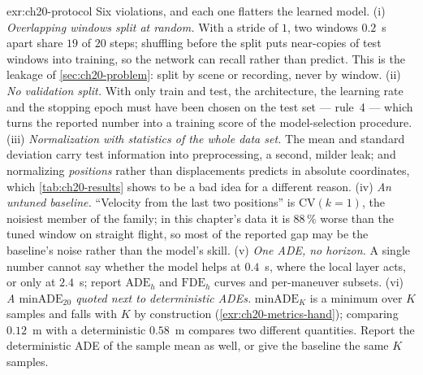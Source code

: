 \begin{solution}{exr:ch20-protocol}
Six violations, and each one flatters the learned model.
(i) \emph{Overlapping windows split at random.} With a stride of $1$, two windows $0.2$~s apart share $19$ of $20$ steps; shuffling before the split puts near-copies of test windows into training, so the network can recall rather than predict. This is the leakage of \cref{sec:ch20-problem}: split by scene or recording, never by window.
(ii) \emph{No validation split.} With only train and test, the architecture, the learning rate and the stopping epoch must have been chosen on the test set --- rule~4 --- which turns the reported number into a training score of the model-selection procedure.
(iii) \emph{Normalization with statistics of the whole data set.} The mean and standard deviation carry test information into preprocessing, a second, milder leak; and normalizing \emph{positions} rather than displacements predicts in absolute coordinates, which \cref{tab:ch20-results} shows to be a bad idea for a different reason.
(iv) \emph{An untuned baseline.} ``Velocity from the last two positions'' is $\mathrm{CV}(k = 1)$, the noisiest member of the family; in this chapter's data it is $88\,\%$ worse than the tuned window on straight flight, so most of the reported gap may be the baseline's noise rather than the model's skill.
(v) \emph{One ADE, no horizon.} A single number cannot say whether the model helps at $0.4$~s, where the local layer acts, or only at $2.4$~s; report $\mathrm{ADE}_h$ and $\mathrm{FDE}_h$ curves and per-maneuver subsets.
(vi) \emph{A $\mathrm{minADE}_{20}$ quoted next to deterministic ADEs.} $\mathrm{minADE}_K$ is a minimum over $K$ samples and falls with $K$ by construction (\cref{exr:ch20-metrics-hand}); comparing $0.12$~m with a deterministic $0.58$~m compares two different quantities. Report the deterministic ADE of the sample mean as well, or give the baseline the same $K$ samples.
\end{solution}
